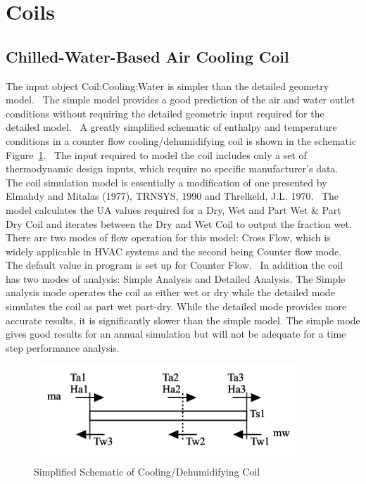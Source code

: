 \section{Coils }\label{coils}

\subsection{Chilled-Water-Based Air Cooling Coil}\label{chilled-water-based-air-cooling-coil}

The input object Coil:Cooling:Water is simpler than the detailed geometry model.~ The simple model provides a good prediction of the air and water outlet conditions without requiring the detailed geometric input required for the detailed model.~ A greatly simplified schematic of enthalpy and temperature conditions in a counter flow cooling/dehumidifying coil is shown in the schematic Figure~\ref{fig:simplified-schematic-of-coolingdehumidifying}.~ The input required to model the coil includes only a set of thermodynamic design inputs, which require no specific manufacturer's data.~ The coil simulation model is essentially a modification of one presented by Elmahdy and Mitalas (1977), TRNSYS, 1990 and Threlkeld, J.L. 1970.~ The model calculates the UA values required for a Dry, Wet and Part Wet \& Part Dry Coil and iterates between the Dry and Wet Coil to output the fraction wet.~ There are two modes of flow operation for this model: Cross Flow, which is widely applicable in HVAC systems and the second being Counter flow mode. The default value in program is set up for Counter Flow.~ In addition the coil has two modes of analysis: Simple Analysis and Detailed Analysis. The Simple analysis mode operates the coil as either wet or dry while the detailed mode simulates the coil as part wet part-dry. While the detailed mode provides more accurate results, it is significantly slower than the simple model. The simple mode gives good results for an annual simulation but will not be adequate for a time step performance analysis.

\begin{figure}[hbtp] %
\centering
\includegraphics[width=0.9\textwidth, height=0.9\textheight, keepaspectratio=true]{media/image3304.svg.png}
\caption{  Simplified Schematic of Cooling/Dehumidifying Coil \protect \label{fig:simplified-schematic-of-coolingdehumidifying}}
\end{figure}

